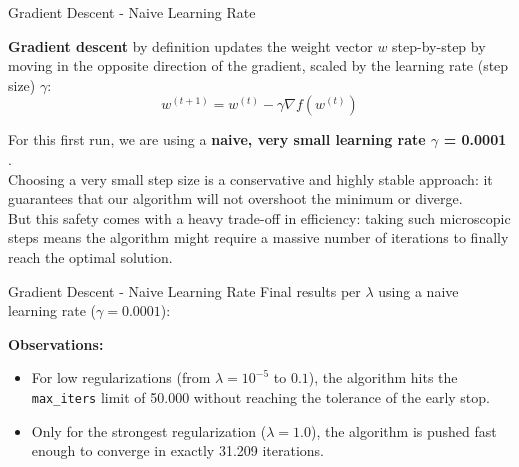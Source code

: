 \documentclass[10pt]{beamer}
\begin{document}
\begin{frame}{Gradient Descent - Naive Learning Rate}

    \textbf{Gradient descent} by definition updates the weight vector $w$ step-by-step by moving in the opposite direction of the gradient, scaled by the learning rate (step size) $\gamma$:
    $$w^{(t+1)} = w^{(t)} - \gamma \nabla f(w^{(t)})$$

    \vspace{0.1cm}

    For this first run, we are using a \textbf{naive, very small learning rate $\gamma$ = 0.0001 }. \\[0.2cm]
    Choosing a very small step size is a conservative and highly stable approach: it guarantees that our algorithm will not overshoot the minimum or diverge. \\[0.2cm]
    But this safety comes with a heavy trade-off in efficiency: taking such microscopic steps means the algorithm might require a massive number of iterations to finally reach the optimal solution.
    
\end{frame}

\begin{frame}{Gradient Descent - Naive Learning Rate}
    \small
    Final results per $\lambda$ using a naive learning rate ($\gamma = 0.0001$):

    \vspace{0.4cm}
    \begin{table}[]
        \centering
    \end{table}

    \vspace{0.4cm}
    \textbf{Observations:}
    \begin{itemize}
        \item For low regularizations (from $\lambda=10^{-5}$ to $0.1$), the algorithm hits the \texttt{max\_iters} limit of 50.000 without reaching the tolerance of the early stop.
        \item Only for the strongest regularization ($\lambda = 1.0$), the algorithm is pushed fast enough to converge in exactly 31.209 iterations.
    \end{itemize}
\end{frame}
\end{document}
